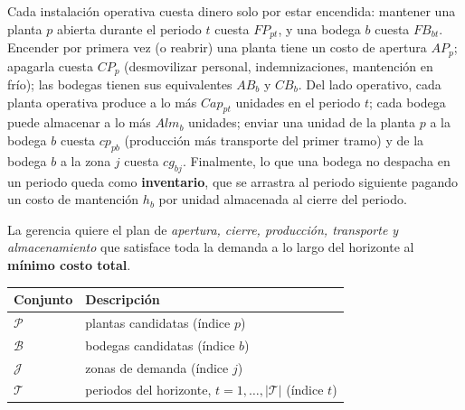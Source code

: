 \documentclass[11pt]{article}
\begin{document}
Cada instalación operativa cuesta dinero solo por estar encendida: mantener una planta $p$ abierta durante el periodo $t$ cuesta $\mathit{FP}_{pt}$, y una bodega $b$ cuesta $\mathit{FB}_{bt}$. Encender por primera vez (o reabrir) una planta tiene un costo de apertura $\mathit{AP}_{p}$; apagarla cuesta $\mathit{CP}_{p}$ (desmovilizar personal, indemnizaciones, mantención en frío); las bodegas tienen sus equivalentes $\mathit{AB}_{b}$ y $\mathit{CB}_{b}$. Del lado operativo, cada planta operativa produce a lo más $\mathit{Cap}_{pt}$ unidades en el periodo $t$; cada bodega puede almacenar a lo más $\mathit{Alm}_{b}$ unidades; enviar una unidad de la planta $p$ a la bodega $b$ cuesta $\mathit{cp}_{pb}$ (producción más transporte del primer tramo) y de la bodega $b$ a la zona $j$ cuesta $\mathit{cg}_{bj}$. Finalmente, lo que una bodega no despacha en un periodo queda como \textbf{inventario}, que se arrastra al periodo siguiente pagando un costo de mantención $h_{b}$ por unidad almacenada al cierre del periodo.

La gerencia quiere el plan de \emph{apertura, cierre, producción, transporte y almacenamiento} que satisface toda la demanda a lo largo del horizonte al \textbf{mínimo costo total}.

\medskip

\begin{center}
\begin{tabular}{@{}ll@{}}
\toprule
\textbf{Conjunto} & \textbf{Descripción} \\
\midrule
$\mathcal{P}$ & plantas candidatas (índice $p$) \\
$\mathcal{B}$ & bodegas candidatas (índice $b$) \\
$\mathcal{J}$ & zonas de demanda (índice $j$) \\
$\mathcal{T}$ & periodos del horizonte, $t=1,\dots,|\mathcal{T}|$ (índice $t$) \\
\bottomrule
\end{tabular}
\end{center}

\medskip
\end{document}
